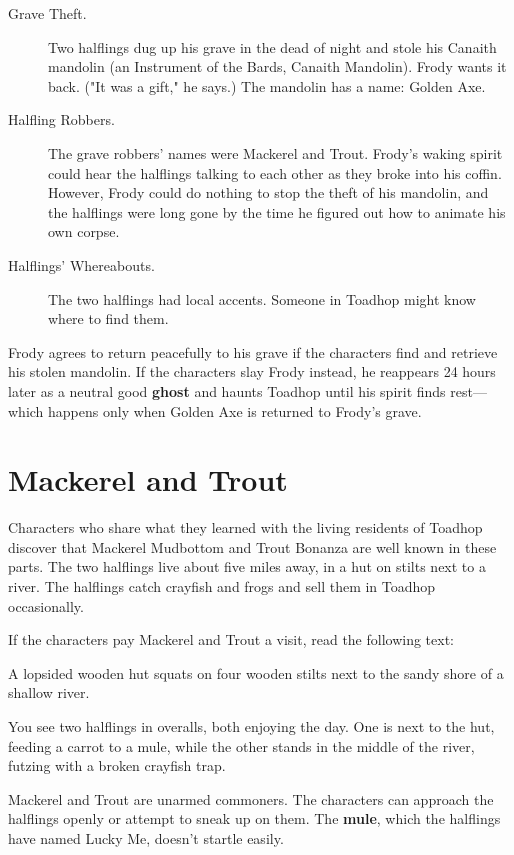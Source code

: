 \documentclass[10pt,a4paper,twoside,bg=print,twocolumn,openany,nodeprecatedcode]{dndbook}
\begin{document}
\begin{description}
\item[Grave Theft.]
Two halflings dug up his grave in the dead of night and stole his Canaith mandolin (an Instrument of the Bards, Canaith Mandolin). Frody wants it back. ("It was a gift," he says.) The mandolin has a name: Golden Axe.
\item[Halfling Robbers.]
The grave robbers' names were Mackerel and Trout. Frody's waking spirit could hear the halflings talking to each other as they broke into his coffin. However, Frody could do nothing to stop the theft of his mandolin, and the halflings were long gone by the time he figured out how to animate his own corpse.
\item[Halflings' Whereabouts.]
The two halflings had local accents. Someone in Toadhop might know where to find them.
\end{description}

Frody agrees to return peacefully to his grave if the characters find and retrieve his stolen mandolin. If the characters slay Frody instead, he reappears 24 hours later as a neutral good \textbf{ghost} and haunts Toadhop until his spirit finds rest—which happens only when Golden Axe is returned to Frody's grave.

\section{Mackerel and Trout}
Characters who share what they learned with the living residents of Toadhop discover that Mackerel Mudbottom and Trout Bonanza are well known in these parts. The two halflings live about five miles away, in a hut on stilts next to a river. The halflings catch crayfish and frogs and sell them in Toadhop occasionally.

If the characters pay Mackerel and Trout a visit, read the following text:

\begin{DndReadAloud}{}
A lopsided wooden hut squats on four wooden stilts next to the sandy shore of a shallow river.

You see two halflings in overalls, both enjoying the day. One is next to the hut, feeding a carrot to a mule, while the other stands in the middle of the river, futzing with a broken crayfish trap.

\end{DndReadAloud}

Mackerel and Trout are unarmed commoners. The characters can approach the halflings openly or attempt to sneak up on them. The \textbf{mule}, which the halflings have named Lucky Me, doesn't startle easily.
\end{document}
